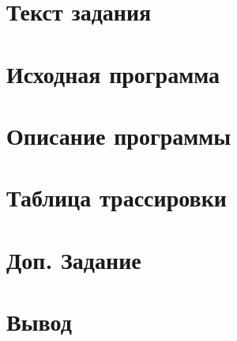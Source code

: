 \documentclass[a4paper, 11pt]{article}
\begin{document}


\tableofcontents
\vspace{2em}
\pagebreak{}

\section{Текст задания}


\section{Исходная программа}


\section{Описание программы}


\section{Таблица трассировки}


\section{Доп. Задание}


\section{Вывод}

\end{document}
